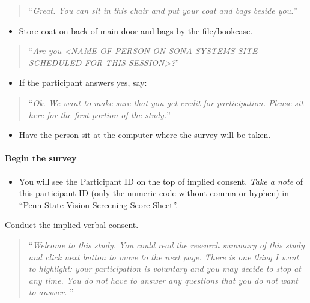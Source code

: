 \documentclass[]{article}
\providecommand{\tightlist}{%
  \setlength{\itemsep}{0pt}\setlength{\parskip}{0pt}}
\let\oldparagraph\paragraph
\renewcommand{\paragraph}[1]{\oldparagraph{#1}\mbox{}}
\begin{document}
\begin{quote}
``\emph{Great. You can sit in this chair and put your coat and bags
beside you.}''
\end{quote}

\begin{itemize}
\tightlist
\item
  Store coat on back of main door and bags by the file/bookcase.
\end{itemize}

\begin{quote}
``\emph{Are you \textless{}NAME OF PERSON ON SONA SYSTEMS SITE SCHEDULED
FOR THIS SESSION\textgreater{}?}''
\end{quote}

\begin{itemize}
\tightlist
\item
  If the participant answers yes, say:
\end{itemize}

\begin{quote}
``\emph{Ok. We want to make sure that you get credit for participation.
Please sit here for the first portion of the study.}''
\end{quote}

\begin{itemize}
\tightlist
\item
  Have the person sit at the computer where the survey will be taken.
\end{itemize}

\paragraph{Begin the survey}\label{begin-the-survey}

\begin{itemize}
\tightlist
\item
  You will see the Participant ID on the top of implied consent.
  \emph{Take a note} of this participant ID (only the numeric code
  without comma or hyphen) in ``Penn State Vision Screening Score
  Sheet''.
\end{itemize}

Conduct the implied verbal consent.

\begin{quote}
``\emph{Welcome to this study. You could read the research summary of
this study and click next button to move to the next page. There is one
thing I want to highlight: your participation is voluntary and you may
decide to stop at any time. You do not have to answer any questions that
you do not want to answer. }''
\end{quote}
\end{document}
